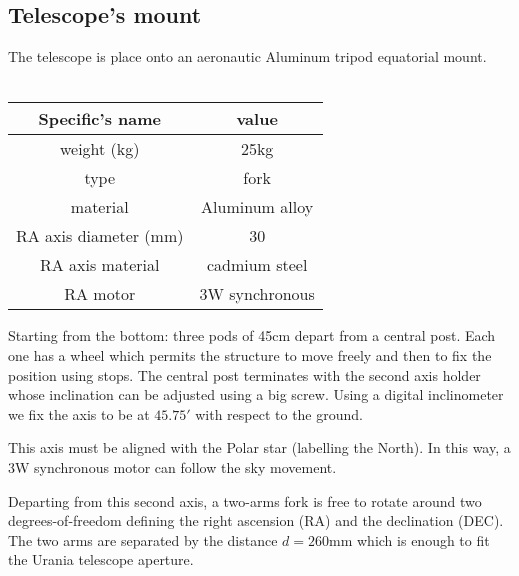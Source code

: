 \subsection{Telescope's mount}
The telescope is place onto an aeronautic Aluminum tripod equatorial mount.
\\
\\
\begin{minipage}{.4\textwidth}
    \begin{tabular}{c|c}
        \hline
        \textbf{Specific's name} & \textbf{value} \\
        \hline
        weight (kg) & 25kg \\
        type & fork \\
        material & Aluminum alloy \\
        RA axis diameter (mm) & 30 \\
        RA axis material & cadmium steel \\
        RA motor & 3W synchronous \\
        \hline
    \end{tabular}
    \label{tab:mount}
\end{minipage}

Starting from the bottom: three pods of 45cm depart from a central post. Each one has a wheel which permits the structure to move freely and then to fix the position using stops.
The central post terminates with the second axis holder whose inclination can be adjusted using a big screw.
Using a digital inclinometer we fix the axis to be at \(45.75'\) with respect to the ground.

This axis must be aligned with the Polar star (labelling the North).
In this way, a 3W synchronous motor can follow the sky movement.

Departing from this second axis, a two-arms fork is free to rotate around two degrees-of-freedom defining the right ascension (RA) and the declination (DEC).
The two arms are separated by the distance \(d = 260\)mm which is enough to fit the Urania telescope aperture.
